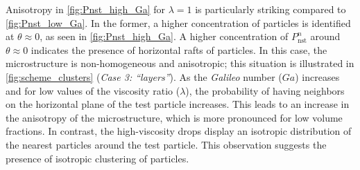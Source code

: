 Anisotropy in \ref{fig:Pnst_high_Ga} for $\lambda=1$ is particularly striking compared to \ref{fig:Pnst_low_Ga}. 
In the former, a higher concentration of particles is identified at $\theta \approx 0$, as seen in \ref{fig:Pnst_high_Ga}. 
A higher concentration of $P_\text{nst}^n$ around $\theta \approx 0$ indicates the presence of horizontal rafts of particles. 
In this case, the microstructure is non-homogeneous and anisotropic; this situation is illustrated in \ref{fig:scheme_clusters} (\textit{Case 3: ``layers''}). 
As the \textit{Galileo} number ($Ga$) increases and for low values of the viscosity ratio ($\lambda$), the probability of having neighbors on the horizontal plane of the test particle increases. 
This leads to an increase in the anisotropy of the microstructure, which is more pronounced for low volume fractions. 
In contrast, the high-viscosity drops display an isotropic distribution of the nearest particles around the test particle. 
This observation suggests the presence of isotropic clustering of particles.




